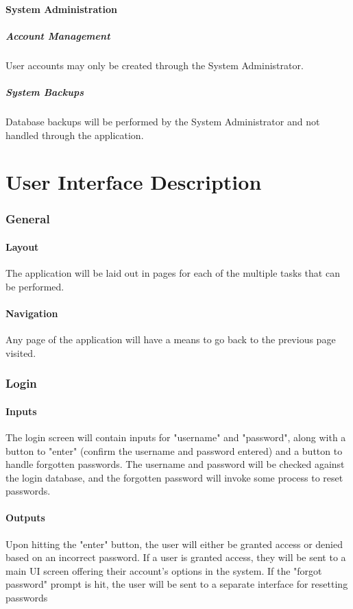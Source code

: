 \documentclass{article}
\begin{document}
\subsection{System Administration}
\subsubsection{Account Management}
User accounts may only be created through the System Administrator.
\subsubsection{System Backups}
Database backups will be performed by the System Administrator and not handled
through the application.

\part{User Interface Description}

\section{General}
\subsection{Layout}
The application will be laid out in pages for each of the multiple tasks that
can be performed.
\subsection{Navigation}
Any page of the application will have a means to go back to the previous
page visited.

\section{Login}
\subsection{Inputs}
The login screen will contain inputs for "username" and "password", along with a
button to "enter" (confirm the username and password entered) and a button to handle
forgotten passwords. The username and password will be checked against the login database,
and the forgotten password will invoke some process to reset passwords.
\subsection{Outputs}
Upon hitting the "enter" button, the user will either be granted access or denied based
on an incorrect password. If a user is granted access, they will be sent
to a main UI screen offering their account's options in the system. If the "forgot password"
 prompt is hit, the user will be sent to a separate interface for resetting passwords
\end{document}

